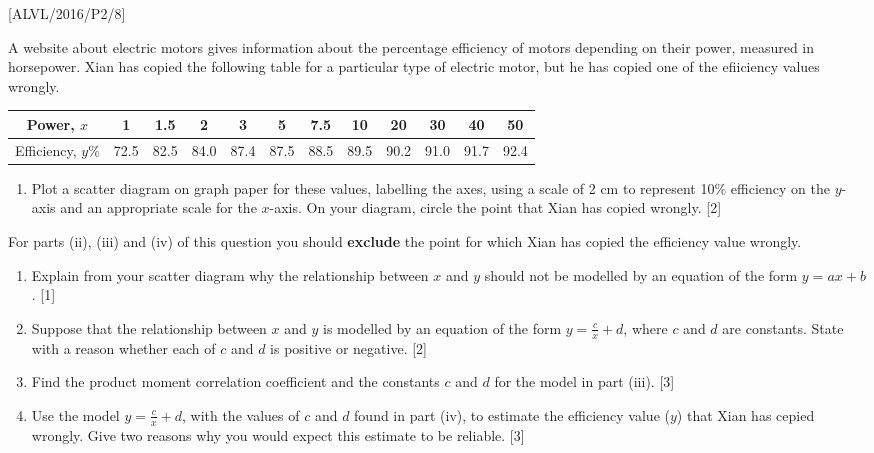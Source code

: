 \item {[}ALVL/2016/P2/8{]}

A website about electric motors gives information about the percentage
efficiency of motors depending on their power, measured in horsepower.
Xian has copied the following table for a particular type of electric
motor, but he has copied one of the efiiciency values wrongly.
\noindent \begin{center}
\begin{tabular}{|c|c|c|c|c|c|c|c|c|c|c|c|}
\hline 
Power, $x$ & 1 & 1.5 & 2 & 3 & 5 & 7.5 & 10 & 20 & 30 & 40 & 50\tabularnewline
\hline 
Efficiency, $y\%$ & 72.5 & 82.5 & 84.0 & 87.4 & 87.5 & 88.5 & 89.5 & 90.2 & 91.0 & 91.7 & 92.4\tabularnewline
\hline 
\end{tabular}
\par\end{center}
\begin{enumerate}
\item Plot a scatter diagram on graph paper for these values, labelling
the axes, using a scale of 2 cm to represent 10\% efficiency on the
$y$-axis and an appropriate scale for the $x$-axis. On your diagram,
circle the point that Xian has copied wrongly. \hfill{}{[}2{]}
\end{enumerate}
For parts (ii), (iii) and (iv) of this question you should \textbf{exclude}
the point for which Xian has copied the efficiency value wrongly.
\begin{enumerate}
\item Explain from your scatter diagram why the relationship between $x$
and $y$ should not be modelled by an equation of the form $y=ax+b$.
\hfill{}{[}1{]}
\item Suppose that the relationship between $x$ and $y$ is modelled by
an equation of the form $y=\frac{c}{x}+d$, where $c$ and $d$ are
constants. State with a reason whether each of $c$ and $d$ is positive
or negative. \hfill{}{[}2{]}
\item Find the product moment correlation coefficient and the constants
$c$ and $d$ for the model in part (iii). \hfill{}{[}3{]}
\item Use the model $y=\frac{c}{x}+d$, with the values of $c$ and $d$
found in part (iv), to estimate the efficiency value ($y$) that Xian
has cepied wrongly. Give two reasons why you would expect this estimate
to be reliable. \hfill{}{[}3{]}
\end{enumerate}
